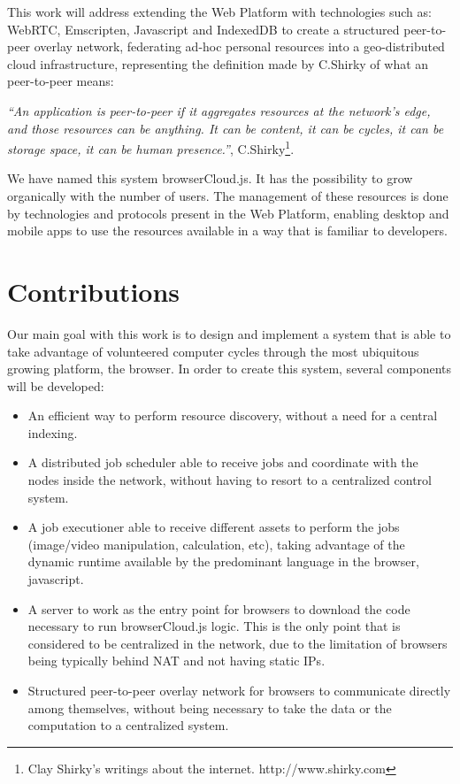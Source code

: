 This work will address extending the Web Platform with technologies such as: WebRTC, Emscripten, Javascript and IndexedDB to create a structured peer-to-peer overlay network, federating ad-hoc personal resources into a geo-distributed cloud infrastructure, representing the definition made by C.Shirky of what an peer-to-peer means:

\textit{``An application is peer-to-peer if it aggregates resources at the network’s edge, and those resources can be anything. It can be content, it can be cycles, it can be storage space, it can be human presence.''}, C.Shirky\footnote{Clay Shirky's writings about the internet. http://www.shirky.com}.

We have named this system browserCloud.js. It has the possibility to grow organically with the number of users. The management of these resources is done by technologies and protocols present in the Web Platform, enabling desktop and mobile apps to use the resources available in a way that is familiar to developers.

\section{Contributions}

Our main goal with this work is to design and implement a system that is able to take advantage of volunteered computer cycles through the most ubiquitous growing platform, the browser. In order to create this system, several components will be developed:

\begin{itemize}
    \item An efficient way to perform resource discovery, without a need for a central indexing.
    \item A distributed job scheduler able to receive jobs and coordinate with the nodes inside the network, without having to resort to a centralized control system.
    \item A job executioner able to receive different assets to perform the jobs (image/video manipulation, calculation, etc), taking advantage of the dynamic runtime available by the predominant language in the browser, javascript.
    \item A server to work as the entry point for browsers to download the code necessary to run browserCloud.js logic. This is the only point that is considered to be centralized in the network, due to the limitation of browsers being typically behind NAT and not having static IPs.
    \item Structured peer-to-peer overlay network for browsers to communicate directly among themselves, without being necessary to take the data or the computation to a centralized system.
\end{itemize}

